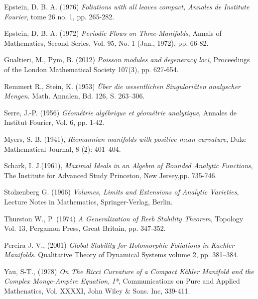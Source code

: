 \documentclass[12pt,twoside,a4paper]{report}
\begin{document}
\begin{thebibliography}
 Epstein, D. B. A. (1976) \textit{Foliations with all leaves compact, Annales de Institute Fourier},
tome 26 no. 1, pp. 265-282.

 Epstein, D. B. A. (1972) \textit{Periodic Flows on Three-Manifolds}, Annals of Mathematics,
Second Series, Vol. 95, No. 1 (Jan., 1972), pp. 66-82.

 Gualtieri, M., Pym, B. (2012) \textit{Poisson modules and degeneracy loci},
Proceedings of the London Mathematical Society 107(3), pp. 627-654.

 Remmert R., Stein, K. (1953) \textit{Über die wesentlichen
Singulariäten analyscher Mengen}. Math. Annalen, Bd. 126, S. 263--306.

 Serre, J.-P. (1956) \textit{G\'eom\'etrie alg\'ebrique et g\'eom\'etrie analytique}, Annales de Institut Fourier, Vol. 6, pp. 1-42.

 Myers, S. B. (1941), \textit{Riemannian manifolds with positive mean curvature}, Duke Mathematical Journal,
8 (2): 401–404.

 Schark, I. J.(1961), \textit{Maximal Ideals in an Algebra of Bounded Analytic Functions}, The Institute for Advanced Study
Princeton, New Jersey,pp. 735-746.

 Stolzenberg G. (1966) \textit{Volumes, Limits and
Extensions of Analytic Varieties}, Lecture Notes in Mathematics,
Springer-Verlag, Berlin.

 Thurston W., P. (1974) \textit{A Generalization of Reeb Stability Theorem}, Topology Vol. 13,
Pergamon Press, Great Britain, pp. 347-352.

 Pereira J. V., (2001) \textit{Global Stability for Holomorphic Foliations in Kaehler Manifolds}.
Qualitative Theory of Dynamical Systems volume 2, pp. 381–384.

 Yau, S-T., (1978) \textit{On The Ricci Curvature of a Compact K\"ahler Manifold and the Complex Monge-Amp\`ere Equation, I*},
Communications on Pure and Applied Mathenatics, Vol. XXXXI, John Wiley \& Sons. Inc, 339-411.
\end{thebibliography}
\end{document}
